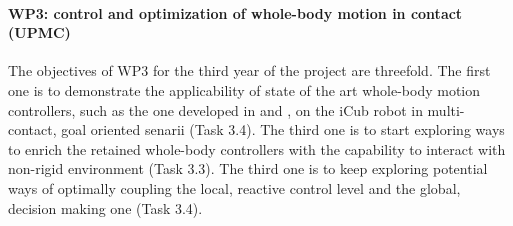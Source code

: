 \paragraph{WP3: control and optimization of whole-body motion in contact (UPMC)}

The objectives of WP3 for the third year of the project are threefold. The first one is to demonstrate the applicability of state of the art whole-body motion controllers, such as the one developed in \cite{salini2012} and \cite{delprete2013}, on the iCub robot in multi-contact, goal oriented senarii (Task 3.4). The third one is to start exploring ways to enrich the retained whole-body controllers with the capability to interact with non-rigid environment (Task 3.3). The third one is to keep exploring potential ways of optimally coupling the local, reactive control level and the global, decision making one (Task 3.4).
